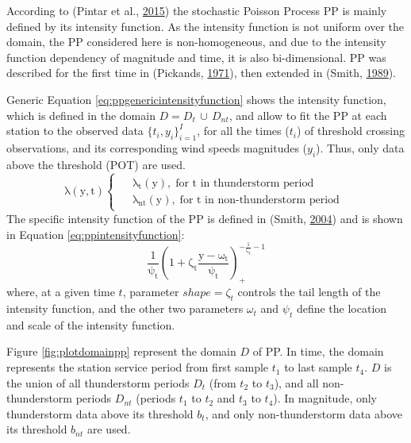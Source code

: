 \documentclass[12pt,twoside]{reedthesis}
\begin{document}
According to (Pintar et al., \protect\hyperlink{ref-Pintar2015}{2015}) the stochastic Poisson Process PP is mainly defined by its intensity function. As the intensity function is not uniform over the domain, the PP considered here is non-homogeneous, and due to the intensity function dependency of magnitude and time, it is also bi-dimensional. PP was described for the first time in (Pickands, \protect\hyperlink{ref-Pickands1971}{1971}), then extended in (Smith, \protect\hyperlink{ref-Smith1989}{1989}).

Generic Equation \eqref{eq:ppgenericintensityfunction} shows the intensity function, which is defined in the domain \(D = D_t\,{\cup}\,D_{nt}\), and allow to fit the PP at each station to the observed data \(\{t_i, y_i\}_{i=1}^I\), for all the times (\(t_i\)) of threshold crossing observations, and its corresponding wind speeds magnitudes (\(y_i\)). Thus, only data above the threshold (POT) are used.
\begin{equation}
  \mathrm{
    \lambda\left(y,t\right)
    \begin{cases}
      \begin{split}
            &\lambda_t(y),\;\textrm{for t in thunderstorm period}
            \\
            &\lambda_{nt}(y),\;\textrm{for t in non-thunderstorm period}      
      \end{split}
    \end{cases}
  }
  \label{eq:ppgenericintensityfunction}
\end{equation}
The specific intensity function of the PP is defined in (Smith, \protect\hyperlink{ref-Smith2004}{2004}) and is shown in Equation \eqref{eq:ppintensityfunction}:
\begin{equation}
  \mathrm{
    \frac{1}{\psi_t}\left(1+\zeta_t\frac{y-\omega_t}{\psi_t}\right)_+^{-\frac{1}{\zeta_t}-1}
  }
  \label{eq:ppintensityfunction}
\end{equation}
where, at a given time \(t\), parameter \(shape = \zeta_t\) controls the tail length of the intensity function, and the other two parameters \(\omega_t\) and \(\psi_t\) define the location and scale of the intensity function.

Figure \ref{fig:plotdomainpp} represent the domain \(D\) of PP. In time, the domain represents the station service period from first sample \(t_1\) to last sample \(t_4\). \(D\) is the union of all thunderstorm periods \(D_t\) (from \(t_2\) to \(t_3\)), and all non-thunderstorm periods \(D_{nt}\) (periods \(t_1\) to \(t_2\) and \(t_3\) to \(t_4\)). In magnitude, only thunderstorm data above its threshold \(b_t\), and only non-thunderstorm data above its threshold \(b_{nt}\) are used.
\end{document}

